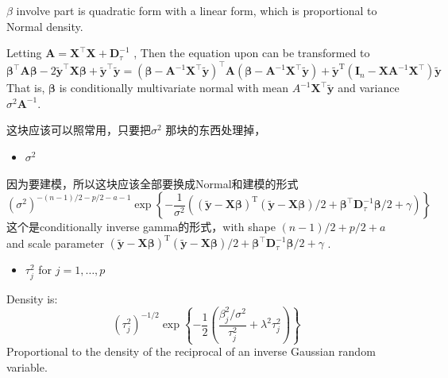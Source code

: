 \documentclass[
]{book}
\providecommand{\tightlist}{%
  \setlength{\itemsep}{0pt}\setlength{\parskip}{0pt}}
\theoremstyle{definition}
\theoremstyle{definition}
\theoremstyle{definition}
\theoremstyle{remark}
\begin{document}
\(\beta\) involve part is quadratic form with a linear form, which is proportional to Normal density.

Letting \(\boldsymbol{A}=\boldsymbol{X}^{\top} \boldsymbol{X}+\boldsymbol{D}_{\tau}^{-1}\) , Then the equation upon can be transformed to
\[
\boldsymbol{\beta}^{\top} \boldsymbol{A} \boldsymbol{\beta}-2 \tilde{\boldsymbol{y}}^{\top} \boldsymbol{X} \boldsymbol{\beta}+\tilde{\boldsymbol{y}}^{\top} \tilde{\boldsymbol{y}}=\left(\boldsymbol{\beta}-\boldsymbol{A}^{-1} \boldsymbol{X}^{\top} \tilde{\boldsymbol{y}}\right)^{\top} \boldsymbol{A}\left(\boldsymbol{\beta}-\boldsymbol{A}^{-1} \boldsymbol{X}^{\top} \tilde{\boldsymbol{y}}\right)+\tilde{\boldsymbol{y}}^{\mathrm{T}}\left(\boldsymbol{I}_{n}-\boldsymbol{X} \boldsymbol{A}^{-1} \boldsymbol{X}^{\top}\right) \tilde{\boldsymbol{y}}
\]
That is, \(\boldsymbol \beta\) is conditionally multivariate normal with mean \(A^{-1} \boldsymbol{X}^{\top} \tilde{\boldsymbol{y}}\) and variance \(\sigma^{2} \boldsymbol{A}^{-1}\).

这块应该可以照常用，只要把\(\sigma^2\) 那块的东西处理掉，

\begin{itemize}
\tightlist
\item
  \(\sigma^2\)
\end{itemize}

因为要建模，所以这块应该全部要换成Normal和建模的形式
\[
\left(\sigma^{2}\right)^{-(n-1) / 2-p / 2-a-1} \exp \left\{-\frac{1}{\sigma^{2}}\left((\tilde{\boldsymbol{y}}-\boldsymbol{X} \boldsymbol{\beta})^{\mathrm{T}}(\tilde{\boldsymbol{y}}-\boldsymbol{X} \boldsymbol{\beta}) / 2+\boldsymbol{\beta}^{\top} \boldsymbol{D}_{\tau}^{-1} \boldsymbol{\beta} / 2+\gamma\right)\right\}
\]
这个是conditionally inverse gamma的形式，with shape \((n-1) / 2+p / 2+a\) and scale parameter \((\tilde{\boldsymbol{y}}-\boldsymbol{X} \boldsymbol{\beta})^{\mathrm{T}}(\tilde{\boldsymbol{y}}-\boldsymbol{X} \boldsymbol{\beta}) / 2+\boldsymbol{\beta}^{\top} \boldsymbol{D}_{\tau}^{-1} \boldsymbol{\beta} / 2+\gamma\) .

\begin{itemize}
\tightlist
\item
  \(\tau_j^2\) for \(j=1,…,p\)
\end{itemize}

Density is:
\[
\left(\tau_{j}^{2}\right)^{-1 / 2} \exp \left\{-\frac{1}{2}\left(\frac{\beta_{j}^{2} / \sigma^{2}}{\tau_{j}^{2}}+\lambda^{2} \tau_{j}^{2}\right)\right\}
\]
Proportional to the density of the reciprocal of an inverse Gaussian random variable.
\end{document}
